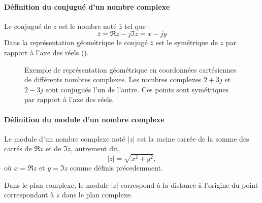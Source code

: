 \paragraph{Définition du conjugué d'un nombre complexe}
Le conjugué de $z$ est le nombre noté $\bar{z}$ tel que :
\[
\bar{z}=\Re{z}-j\Im{z}=x-jy
\]
Dans la représentation géométrique le conjugé $\bar{z}$ est le symétrique 
de $z$ par rapport à l'axe des réels ().
\begin{figure}[!h]
    \centering
    
    \caption{Exemple de représentation géométrique en coordonnées cartésiennes 
             de différents nombres complexes. Les nombres complexes $2+3j$ et 
             $2-3j$ sont conjugués l'un de l'autre. Ces points sont symétriques
             par rapport à l'axe des réels.
             \label{fig-plan_complexe}}
\end{figure}
\paragraph{Définition du module d'un nombre complexe}
Le module d'un nombre complexe noté $|z|$ est la 
racine carrée de la somme des carrés de $\Re{z}$ et de $\Im{z}$, 
autrement dit, 
\[
|z|=\sqrt{x^2+y^2},
\]
où $x=\Re{z}$ et $y=\Im{z}$ comme définis précedemment.

Dans le plan complexe, le module $|z|$ correspond à la distance à l'origine du 
point correspondant à $z$ dans le plan complexe.
